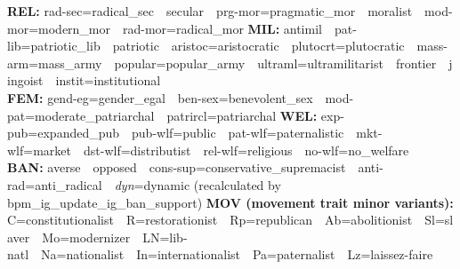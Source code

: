 \documentclass[a4paper]{article}
\begin{document}
{\textbf{REL:} rad-sec=radical\_sec~\textbullet~secular~\textbullet~prg-mor=pragmatic\_mor~\textbullet~moralist~\textbullet~mod-mor=modern\_mor~\textbullet~rad-mor=radical\_mor\quad
\textbf{MIL:} antimil~\textbullet~pat-lib=patriotic\_lib~\textbullet~patriotic~\textbullet~aristoc=aristocratic~\textbullet~plutocrt=plutocratic~\textbullet~mass-arm=mass\_army~\textbullet~popular=popular\_army~\textbullet~ultraml=ultramilitarist~\textbullet~frontier~\textbullet~jingoist~\textbullet~instit=institutional\\
\textbf{FEM:} gend-eg=gender\_egal~\textbullet~ben-sex=benevolent\_sex~\textbullet~mod-pat=moderate\_patriarchal~\textbullet~patrircl=patriarchal\quad
\textbf{WEL:} exp-pub=expanded\_pub~\textbullet~pub-wlf=public~\textbullet~pat-wlf=paternalistic~\textbullet~mkt-wlf=market~\textbullet~dst-wlf=distributist~\textbullet~rel-wlf=religious~\textbullet~no-wlf=no\_welfare\\
\textbf{BAN:} averse~\textbullet~opposed~\textbullet~cons-sup=conservative\_supremacist~\textbullet~anti-rad=anti\_radical~\textbullet~\textit{dyn}=dynamic (recalculated by bpm\_ig\_update\_ig\_ban\_support)\quad
\textbf{MOV (movement trait minor variants):} C=constitutionalist~\textbullet~R=restorationist~\textbullet~Rp=republican~\textbullet~Ab=abolitionist~\textbullet~Sl=slaver~\textbullet~Mo=modernizer~\textbullet~LN=lib-natl~\textbullet~Na=nationalist~\textbullet~In=internationalist~\textbullet~Pa=paternalist~\textbullet~Lz=laissez-faire
}

\vspace{4pt}
\end{document}
